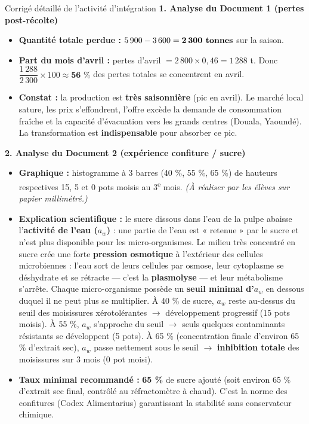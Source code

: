 \documentclass[11pt]{article}
\newcounter{popsec}
\newcounter{popsub}
\newcommand{\courssub}[1]{%
  \stepcounter{popsub}%
  \par\vspace{9pt}\noindent{\popxbold\fontsize{11.5}{13}\selectfont\color{popink}{\color{poporange}\thepopsec.\thepopsub}\hspace{6pt}#1}\par\nopagebreak\vspace{4pt}
}
\begin{document}
\courssub{Démarche et corrigé commenté}
\begin{exoresolu}{Corrigé détaillé de l'activité d'intégration}
\noindent\textbf{1. Analyse du Document 1 (pertes post-récolte)}
\begin{itemize}
    \item \textbf{Quantité totale perdue :} $5\,900 - 3\,600 = \textbf{2\,300 tonnes}$ sur la saison.
    \item \textbf{Part du mois d'avril :} pertes d'avril $= 2\,800 \times 0,46 = 1\,288$ t. Donc $\dfrac{1\,288}{2\,300} \times 100 \approx \textbf{56 \%}$ des pertes totales se concentrent en avril.
    \item \textbf{Constat :} la production est \textbf{très saisonnière} (pic en avril). Le marché local sature, les prix s'effondrent, l'offre excède la demande de consommation fraîche et la capacité d'évacuation vers les grands centres (Douala, Yaoundé). La transformation est \textbf{indispensable} pour absorber ce pic.
\end{itemize}

\noindent\textbf{2. Analyse du Document 2 (expérience confiture / sucre)}
\begin{itemize}
    \item \textbf{Graphique :} histogramme à 3 barres (40 \%, 55 \%, 65 \%) de hauteurs respectives 15, 5 et 0 pots moisis au 3\textsuperscript{e} mois. \emph{(À réaliser par les élèves sur papier millimétré.)}
    \item \textbf{Explication scientifique :} le sucre dissous dans l'eau de la pulpe abaisse l'\textbf{activité de l'eau ($a_w$)} : une partie de l'eau est « retenue » par le sucre et n'est plus disponible pour les micro-organismes. Le milieu très concentré en sucre crée une forte \textbf{pression osmotique} à l'extérieur des cellules microbiennes : l'eau sort de leurs cellules par osmose, leur cytoplasme se déshydrate et se rétracte — c'est la \textbf{plasmolyse} — et leur métabolisme s'arrête. Chaque micro-organisme possède un \textbf{seuil minimal d'$a_w$} en dessous duquel il ne peut plus se multiplier. À 40 \% de sucre, $a_w$ reste au-dessus du seuil des moisissures xérotolérantes $\rightarrow$ développement progressif (15 pots moisis). À 55 \%, $a_w$ s'approche du seuil $\rightarrow$ seuls quelques contaminants résistants se développent (5 pots). À 65 \% (concentration finale d'environ 65 \% d'extrait sec), $a_w$ passe nettement sous le seuil $\rightarrow$ \textbf{inhibition totale} des moisissures sur 3 mois (0 pot moisi).
    \item \textbf{Taux minimal recommandé :} \textbf{65 \%} de sucre ajouté (soit environ 65 \% d'extrait sec final, contrôlé au réfractomètre à chaud). C'est la norme des confitures (Codex Alimentarius) garantissant la stabilité sans conservateur chimique.
\end{itemize}


\end{exoresolu}
\end{document}
